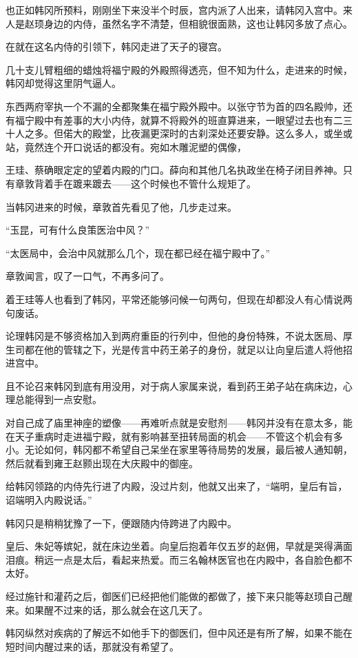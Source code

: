 也正如韩冈所预料，刚刚坐下来没半个时辰，宫内派了人出来，请韩冈入宫中。来人是赵顼身边的内侍，虽然名字不清楚，但相貌很面熟，这也让韩冈多放了点心。

在就在这名内侍的引领下，韩冈走进了天子的寝宫。

几十支儿臂粗细的蜡烛将福宁殿的外殿照得透亮，但不知为什么，走进来的时候，韩冈却觉得这里阴气逼人。

东西两府宰执一个不漏的全都聚集在福宁殿外殿中。以张守节为首的四名殿帅，还有福宁殿中有差事的大小内侍，就算不将殿外的班直算进来，一眼望过去也有二三十人之多。但偌大的殿堂，比夜漏更深时的古刹深处还要安静。这么多人，或坐或站，竟然连个开口说话的都没有。宛如木雕泥塑的偶像，

王珪、蔡确眼定定的望着内殿的门口。薛向和其他几名执政坐在椅子闭目养神。只有章敦背着手在踱来踱去——这个时候也不管什么规矩了。

当韩冈进来的时候，章敦首先看见了他，几步走过来。

“玉昆，可有什么良策医治中风？”

“太医局中，会治中风就那么几个，现在都已经在福宁殿中了。”

章敦闻言，叹了一口气，不再多问了。

着王珪等人也看到了韩冈，平常还能够问候一句两句，但现在却都没人有心情说两句废话。

论理韩冈是不够资格加入到两府重臣的行列中，但他的身份特殊，不说太医局、厚生司都在他的管辖之下，光是传言中药王弟子的身份，就足以让向皇后遣人将他招进宫中。

且不论召来韩冈到底有用没用，对于病人家属来说，看到药王弟子站在病床边，心理总能得到一点安慰。

对自己成了庙里神座的塑像——再难听点就是安慰剂——韩冈并没有在意太多，能在天子重病时走进福宁殿，就有影响甚至扭转局面的机会——不管这个机会有多小。无论如何，韩冈都不希望自己呆坐在家里等待局势的发展，最后被人通知朝，然后就看到雍王赵颢出现在大庆殿中的御座。

给韩冈领路的内侍先行进了内殿，没过片刻，他就又出来了，“端明，皇后有旨，诏端明入内殿说话。”

韩冈只是稍稍犹豫了一下，便跟随内侍跨进了内殿中。

皇后、朱妃等嫔妃，就在床边坐着。向皇后抱着年仅五岁的赵佣，早就是哭得满面泪痕。稍远一点是太后，看起来热爱。而三名翰林医官也在内殿中，各自脸色都不太好。

经过施针和灌药之后，御医们已经把他们能做的都做了，接下来只能等赵顼自己醒来。如果醒不过来的话，那么就会在这几天了。

韩冈纵然对疾病的了解远不如他手下的御医们，但中风还是有所了解，如果不能在短时间内醒过来的话，那就没有希望了。

